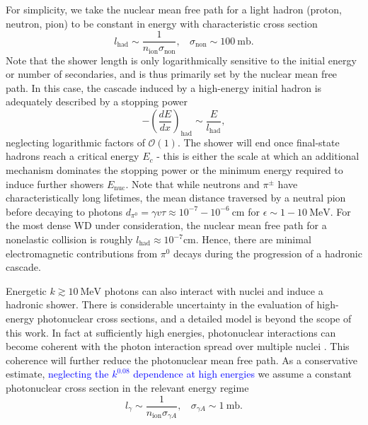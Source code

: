 \documentclass[twocolumn,showpacs,preprintnumbers,amsmath,amssymb,prd]{revtex4}
\newcommand{\OO}{\mathcal{O}}
\def\r{\right)}
\def\l{\left(}
\begin{document}
\begin{appendices}
For simplicity, we take the nuclear mean free path for a light hadron (proton, neutron, pion) to be constant in energy with characteristic cross section
\begin{equation}
l_\text{had} \sim  \frac{1}{n_\text{ion} \sigma_\text{non}}, ~~~~ \sigma_\text{non} \sim 100 ~\text{mb}.
\end{equation}
Note that the shower length is only logarithmically sensitive to the initial energy or number of secondaries, and is thus primarily set by the nuclear mean free path.
In this case, the cascade induced by a high-energy initial hadron is adequately described by a stopping power
\begin{equation}
\label{eq:nucshower}
-\l \frac{dE}{dx}\r_\text{had} \sim \frac{E}{l_\text{had}},
\end{equation}
neglecting logarithmic factors of $\OO(1)$.
The shower will end once final-state hadrons reach a critical energy $E_c$ - this is either the scale at which an additional mechanism dominates the stopping power or the minimum energy required to induce further showers $E_\text{nuc}$.
Note that while neutrons and $\pi^\pm$ have characteristically long lifetimes, the mean distance traversed by a neutral pion before decaying to photons $d_{\pi^0} = \gamma v \tau \approx 10^{-7} - 10^{-6} ~\text{cm}$ for $\epsilon \sim 1 - 10 ~\text{MeV}$.
For the most dense WD under consideration, the nuclear mean free path for a nonelastic collision is roughly $l_\text{had} \approx 10^{-7} \text{cm}$.
Hence, there are minimal electromagnetic contributions from $\pi^0$ decays during the progression of a hadronic cascade.

Energetic $k \gtrsim 10 ~\text{MeV}$ photons can also interact with nuclei and induce a hadronic shower.
There is considerable uncertainty in the evaluation of high-energy photonuclear cross sections, and a detailed model is beyond the scope of this work.
In fact at sufficiently high energies, photonuclear interactions can become coherent with the photon interaction spread over multiple nuclei \cite{Gerhardt:2010bj}.
This coherence will further reduce the photonuclear mean free path.
As a conservative estimate, \textcolor{blue}{neglecting the $k^{0.08}$ dependence at high energies} we assume a constant photonuclear cross section in the relevant energy regime
\begin{equation}
l_\gamma \sim \frac{1}{n_\text{ion} \sigma_{\gamma A}}, ~~~~ \sigma_{\gamma A} \sim 1 ~\text{mb}.
\end{equation}


\end{appendices}
\end{document}
